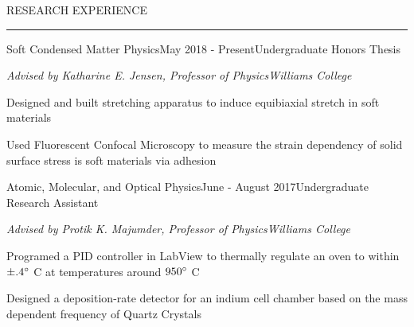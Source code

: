 \documentclass{short_resume} %
\renewenvironment{rSection}[1]{
	\sectionskip
	\textcolor{RoyalPurple}{\MakeUppercase{#1}}
	\sectionlineskip
	\hrule
	\begin{list}{}{
			\setlength{\leftmargin}{1.5em}
		}
		\item[]
	}{
	\end{list}
}
\begin{document}

	
	\begin{rSection}{Research Experience}
		
		\begin{rSubsection}{Soft Condensed Matter Physics}{May 2018 - Present}{Undergraduate Honors Thesis}{}
			\vspace{-.5em}
				\item[] {\em Advised by Katharine E. Jensen, Professor of Physics}\hfill {\em Williams College}
				\item Designed and built stretching apparatus to induce equibiaxial stretch in soft materials
				\item Used Fluorescent Confocal Microscopy to measure the strain dependency of solid surface stress is soft materials via adhesion
		\end{rSubsection}
%		


		\begin{rSubsection}{Atomic, Molecular, and Optical Physics}{June - August 2017}{Undergraduate Research Assistant}{}
			\vspace{-.5em}
			\item[] {\em Advised by Protik K. Majumder, Professor of Physics}\hfill {\em Williams College}
			\item Programed a PID controller in LabView to thermally regulate an oven to within $\pm .4\degree$ C at temperatures around $ 950\degree $ C
			\item Designed a deposition-rate detector for an indium cell chamber based on the mass dependent frequency of Quartz Crystals
		\end{rSubsection}

\end{rSection}
\end{document}
